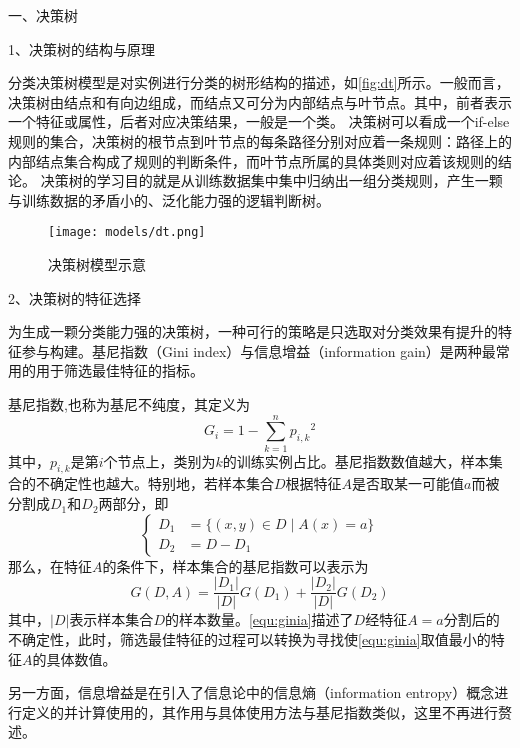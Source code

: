 一、决策树

1、决策树的结构与原理

分类决策树模型是对实例进行分类的树形结构的描述，如\autoref{fig:dt}所示。一般而言，决策树由结点和有向边组成，而结点又可分为内部结点与叶节点。其中，前者表示一个特征或属性，后者对应决策结果，一般是一个类\cite{Li2017,Zhou2016}。
决策树可以看成一个if-else规则的集合，决策树的根节点到叶节点的每条路径分别对应着一条规则：路径上的内部结点集合构成了规则的判断条件，而叶节点所属的具体类则对应着该规则的结论。
决策树的学习目的就是从训练数据集中集中归纳出一组分类规则，产生一颗与训练数据的矛盾小的、泛化能力强的逻辑判断树。
\begin{figure}[htbp]
    \centering
    \texttt{[image: models/dt.png]}
    \caption{\label{fig:dt}决策树模型示意}
\end{figure}

2、决策树的特征选择

为生成一颗分类能力强的决策树，一种可行的策略是只选取对分类效果有提升的特征参与构建。基尼指数（Gini index）与信息增益（information gain）是两种最常用的用于筛选最佳特征的指标。

基尼指数,也称为基尼不纯度，其定义为
\begin{equation}
    \label{equ:gini}
    G_i = 1 - \sum_{k=1}^n{p_{i,k}}^2
\end{equation}
其中，$p_{i,k}$是第$i$个节点上，类别为$k$的训练实例占比。基尼指数数值越大，样本集合的不确定性也越大。特别地，若样本集合$D$根据特征$A$是否取某一可能值$a$而被分割成$D_1$和$D_2$两部分，即
\begin{equation}
    \label{equ:daset}
    \left \{
    \begin{aligned}
        D_1 &= \{ (x,y) \in D \mid A(x) = a\} \\
        D_2 &= D - D_1
    \end{aligned}
    \right.
\end{equation}
那么，在特征$A$的条件下，样本集合的基尼指数可以表示为
\begin{equation}
    \label{equ:ginia}
    G(D,A) = \frac{|D_1|}{|D|}G(D_1) + \frac{|D_2|}{|D|}G(D_2)
\end{equation}
其中，$|D|$表示样本集合$D$的样本数量。\autoref{equ:ginia}描述了$D$经特征$A=a$分割后的不确定性，此时，筛选最佳特征的过程可以转换为寻找使\autoref{equ:ginia}取值最小的特征$A$的具体数值。

另一方面，信息增益是在引入了信息论中的信息熵（information entropy）概念进行定义的并计算使用的，其作用与具体使用方法与基尼指数类似，这里不再进行赘述\cite{Zhou2016,Li2017}。

